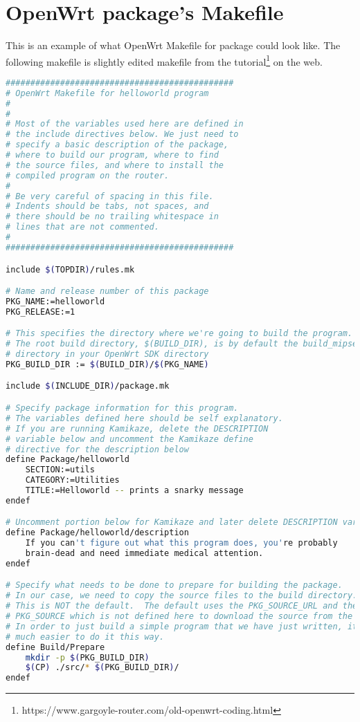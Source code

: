 \chapter{OpenWrt package's Makefile}\label{hello_mkfile}
This is an example of what OpenWrt Makefile for package could look like.
The following makefile is slightly edited makefile from the tutorial\footnote{https://www.gargoyle-router.com/old-openwrt-coding.html} on the web.
\begin{lstlisting}[language=bash,basicstyle=\ttfamily\footnotesize,caption=Makefile for Helloworld.]
##############################################
# OpenWrt Makefile for helloworld program
#
#
# Most of the variables used here are defined in
# the include directives below. We just need to
# specify a basic description of the package,
# where to build our program, where to find
# the source files, and where to install the
# compiled program on the router.
#
# Be very careful of spacing in this file.
# Indents should be tabs, not spaces, and
# there should be no trailing whitespace in
# lines that are not commented.
#
##############################################

include $(TOPDIR)/rules.mk

# Name and release number of this package
PKG_NAME:=helloworld
PKG_RELEASE:=1

# This specifies the directory where we're going to build the program.
# The root build directory, $(BUILD_DIR), is by default the build_mipsel
# directory in your OpenWrt SDK directory
PKG_BUILD_DIR := $(BUILD_DIR)/$(PKG_NAME)

include $(INCLUDE_DIR)/package.mk

# Specify package information for this program.
# The variables defined here should be self explanatory.
# If you are running Kamikaze, delete the DESCRIPTION
# variable below and uncomment the Kamikaze define
# directive for the description below
define Package/helloworld
	SECTION:=utils
	CATEGORY:=Utilities
	TITLE:=Helloworld -- prints a snarky message
endef

# Uncomment portion below for Kamikaze and later delete DESCRIPTION variable above
define Package/helloworld/description
	If you can't figure out what this program does, you're probably
	brain-dead and need immediate medical attention.
endef

# Specify what needs to be done to prepare for building the package.
# In our case, we need to copy the source files to the build directory.
# This is NOT the default.  The default uses the PKG_SOURCE_URL and the
# PKG_SOURCE which is not defined here to download the source from the web.
# In order to just build a simple program that we have just written, it is
# much easier to do it this way.
define Build/Prepare
	mkdir -p $(PKG_BUILD_DIR)
	$(CP) ./src/* $(PKG_BUILD_DIR)/
endef


\end{lstlisting}
